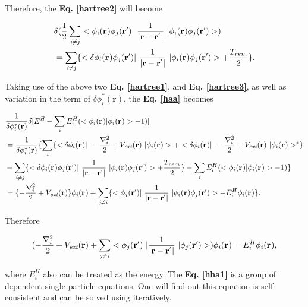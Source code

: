 \documentclass[a4paper, 12pt, titlepage,oneside,drop]{kthesis}
\begin{document}
\noindent Therefore, the \textbf{Eq. \ref{hartree2}} will become 

\begin{equation}\begin{split}\label{hartree3}
&  \delta( \frac{1}{2} \suminj<i><j> <\bwff<i><> \bwfn<j><'>|\ \frac{1}{|\textbf{r} - \textbf{r}^{'} |} \ | \bwff<i><> \bwfn<j><'>>)   \\
& =  \suminj<i><j> \{  <\delta \bwff<i><> \bwfn<j><'>|\ \frac{1}{|\textbf{r} - \textbf{r}^{'} |} \ | \bwff<i><> \bwfn<j><'>> + \frac{T_{rem}}{2}\}.
\end{split}\end{equation}


Taking use of the above two \textbf{Eq. \ref{hartree1}}, and \textbf{Eq. \ref{hartree3}}, as well as variation in the term of  $\delta \phi^{*}_{i}(\textbf{r}{}) $, the \textbf{Eq. \ref{haa}} becomes

\begin{equation}
\begin{split}\label{hha}
& \frac{1}{\delta  \phi^{*}_{i}(\textbf{r}{})} \delta [ E^{\textit{H}} - \sumi<i> E_{i}^{H} (<\bwff<i><> | \bwff<i><> > -1)] \\
&  = \frac{1}{\delta  \phi^{*}_{i}(\textbf{r}{})} \{ \sumi<i> \{ < \delta \bwff<i><> |\ -\frac{\nabla^{2}_{i}}{2} + V_\textit{ext}(\textbf{r})  \ | \bwff<i><> > + <  \delta \bwff<i><> |\ -\frac{\nabla^{2}_{i}}{2} + V_\textit{ext}(\textbf{r})  \ |  \bwff<i><> >^{\ast} \} \\
& +  \suminj<i><j> \{  <\delta \bwff<i><> \bwfn<j><'>|\ \frac{1}{|\textbf{r} - \textbf{r}^{'} |} \ | \bwff<i><> \bwfn<j><'>> + \frac{T_{rem}}{2}\} - \sumi<i> E_{i}^{H} (<\bwff<i><> | \bwff<i><> > -1) \} \\
& =  { \{-\frac{\nabla^{2}_{i}}{2} + V_\textit{ext}(\textbf{r})} \}  \bwff<i><> +  \suminj<j><i> \{  <\bwfn<j><'>|\ \frac{1}{|\textbf{r} - \textbf{r}^{'} |} \ | \bwff<i><> \bwfn<j><'>> - E_{i}^{H}  \bwff<i><>  \}.
\end{split}
\end{equation}

Therefore

\begin{equation}\label{hha1}
(-\frac{\nabla^{2}_{i}}{2} + V_\textit{ext}(\textbf{r})+ \suminj<j><i> <\bwfn<j><'>\ | \frac{1}{|\textbf{r} - \textbf{r}^{'} |} \ | \bwfn<j><'>>) \bwff<i><> = E_{i}^{H} \bwff<i><>,
\end{equation}

where $E_{i}^{H}$  also can be treated as the energy. The \textbf{Eq. \ref{hha1}} is a group of dependent single
 particle equations. One will find out this equation is self-consistent and can be solved using iteratively.
\end{document}

